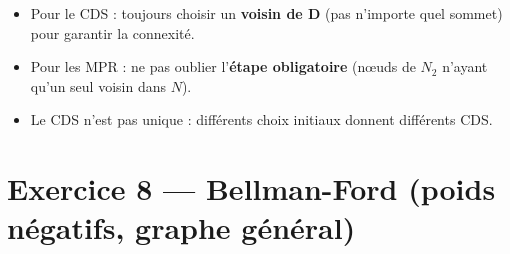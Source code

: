 \documentclass[12pt,a4paper]{article}
\begin{document}
\begin{attention}
\begin{itemize}
    \item Pour le CDS : toujours choisir un \textbf{voisin de D} (pas n'importe quel sommet) pour garantir la connexit\'e.
    \item Pour les MPR : ne pas oublier l'\textbf{\'etape obligatoire} (n\oe uds de $N_2$ n'ayant qu'un seul voisin dans $N$).
    \item Le CDS n'est pas unique : diff\'erents choix initiaux donnent diff\'erents CDS.
\end{itemize}
\end{attention}


\newpage
\section{Exercice 8 --- Bellman-Ford (poids n\'egatifs, graphe g\'en\'eral)}
\end{document}
